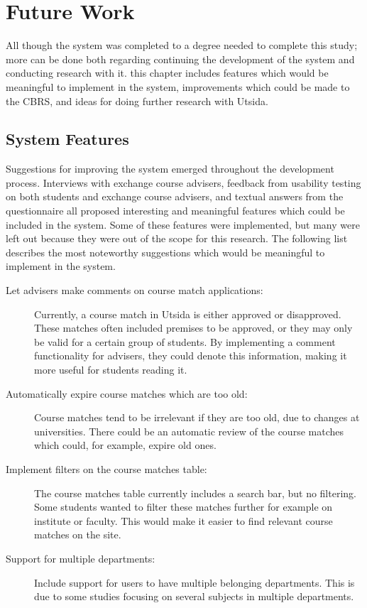 
\chapter{Future Work}

All though the system was completed to a degree needed to complete this study; more can be done both regarding continuing the development of the system and conducting research with it. this chapter includes features which would be meaningful to implement in the system, improvements which could be made to the CBRS, and ideas for doing further research with Utsida.

\section{System Features}
Suggestions for improving the system emerged throughout the development process. Interviews with exchange course advisers, feedback from usability testing on both students and exchange course advisers, and textual answers from the questionnaire all proposed interesting and meaningful features which could be included in the system. Some of these features were implemented, but many were left out because they were out of the scope for this research. The following list describes the most noteworthy suggestions which would be meaningful to implement in the system.

\begin{description}
    \item[Let advisers make comments on course match applications:] Currently, a course match in Utsida is either approved or disapproved. These matches often included premises to be approved, or they may only be valid for a certain group of students. By implementing a comment functionality for advisers, they could denote this information, making it more useful for students reading it.
    \item[Automatically expire course matches which are too old:] Course matches tend to be irrelevant if they are too old, due to changes at universities. There could be an automatic review of the course matches which could, for example, expire old ones.
    \item[Implement filters on the course matches table:] The course matches table currently includes a search bar, but no filtering. Some students wanted to filter these matches further for example on institute or faculty. This would make it easier to find relevant course matches on the site.
    \item[Support for multiple departments:] Include support for users to have multiple belonging departments. This is due to some studies focusing on several subjects in multiple departments.
\end{description}


